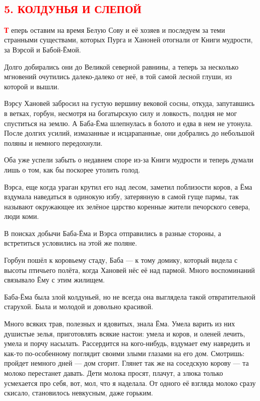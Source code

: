 \documentclass[oneside,final,14pt]{extreport}
\begin{document}
	\
{%
	\centering
	\subsection*{\textcolor{red}{5. КОЛДУНЬЯ И СЛЕПОЙ}}
}
		
		\lettrine[findent=0pt]{\textbf{\textcolor{red}{Т}}}{}  еперь оставим на время Белую Сову и её хозяев и последуем за теми странными существами, которых Пурга и Ханоней отогнали от Книги мудрости, за Вэрсой и Бабой-Ёмой.
		
		Долго добирались они до Великой северной равнины, а теперь за несколько мгновений очутились далеко-далеко от неё, в той самой лесной глуши, из которой и вышли.
		
		Вэрсу Хановей забросил на густую вершину вековой сосны, откуда, запутавшись в ветках, горбун, несмотря на богатырскую силу и ловкость, полдня не мог спуститься на землю. А Баба-Ёма шлепнулась в болото и едва в нем не утонула. После долгих усилий, измазанные и исцарапанные, они добрались до небольшой поляны и немного передохнули.
		
		Оба уже успели забыть о недавнем споре из-за Книги мудрости и теперь думали лишь о том, как бы поскорее утолить голод.
		
		Вэрса, еще когда ураган крутил его над лесом, заметил поблизости коров, а Ёма вздумала наведаться в одинокую избу, затерянную в самой гуще пармы, так называют окружающее их зелёное царство коренные жители печорского севера, люди коми.
		
		В поисках добычи Баба-Ёма и Вэрса отправились в разные стороны, а встретиться условились на этой же поляне.
		
		Горбун пошёл к коровьему стаду, Баба — к тому домику, который видела с высоты птичьего полёта, когда Хановей нёс её над пармой. Много воспоминаний связывало Ёму с этим жилищем.
		
		Баба-Ёма была злой колдуньей, но не всегда она выглядела такой отвратительной старухой. Была и молодой и довольно красивой.
		
		Много всяких трав, полезных и ядовитых, знала Ёма. Умела варить из них душистые зелья, приготовлять всякие настои: умела и коров, и оленей лечить, умела и порчу насылать. Рассердится на кого-нибудь, вздумает ему навредить и как-то по-особенному поглядит своими злыми глазами на его дом. Смотришь: пройдет немного дней — дом сгорит. Глянет так же на соседскую корову — та молоко перестанет давать. Дети молока просят, плачут, а злюка только усмехается про себя, вот, мол, что я наделала. От одного её взгляда молоко сразу скисало, становилось невкусным, даже горьким.
		
\end{document}

